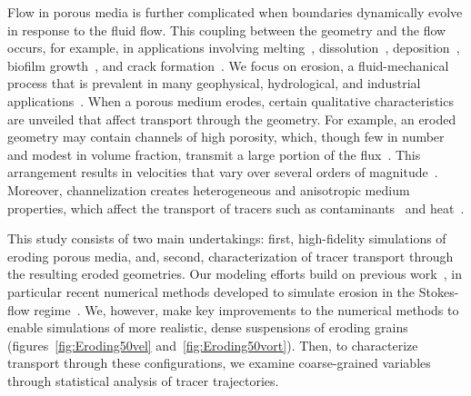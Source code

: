 \documentclass{jfm}
\begin{document}
Flow in porous media is further complicated when boundaries dynamically
evolve in response to the fluid flow. This coupling between the geometry
and the flow occurs, for example, in applications involving
melting~\citep{bec-vis1998, rycroft2016asymmetric, jambon2018singular,
favier2019rayleigh, morrow2019moving},
dissolution~\citep{kan-zha-che-he2002, mac2015shape, moo2017,
wykes2018self}, deposition~\citep{joh-eli1995, hewett2018modelling},
biofilm growth~\citep{tan-val-wer2015}, and crack
formation~\citep{cho2019crack}. We focus on erosion, a fluid-mechanical
process that is prevalent in many geophysical, hydrological, and
industrial applications~\citep{berhanu2012shape, hewett2017evolution,
lachaussee2018competitive, lopez2018cfd, allen2019sde, amin2019role}.
When a porous medium erodes, certain qualitative characteristics are
unveiled that affect transport through the geometry.  For example, an
eroded geometry may contain channels of high porosity, which, though few
in number and modest in volume fraction, transmit a large portion of the
flux~\citep{qua-moo2018}. This arrangement results in velocities that
vary over several orders of magnitude~\citep{all-hea-lab-rei2002}.
Moreover, channelization creates heterogeneous and anisotropic medium
properties, which affect the transport of tracers such as
contaminants~\citep{cve-che-wen1996, dag1987, kon-bre1978} and
heat~\citep{nil-sto1990, ree-sto1995}.

This study consists of two main undertakings: first, high-fidelity
simulations of eroding porous media, and, second, characterization of
tracer transport through the resulting eroded geometries. Our modeling
efforts build on previous work~\citep{ris-moo-chi-she-zha2012,
moore2013self, moo2017}, in particular recent numerical methods
developed to simulate erosion in the Stokes-flow
regime~\citep{qua-moo2018}. We, however, make key improvements to the
numerical methods to enable simulations of more realistic, dense
suspensions of eroding grains (figures~\ref{fig:Eroding50vel}
and~\ref{fig:Eroding50vort}).  Then, to characterize transport through
these configurations, we examine coarse-grained variables through
statistical analysis of tracer trajectories.
\end{document}
